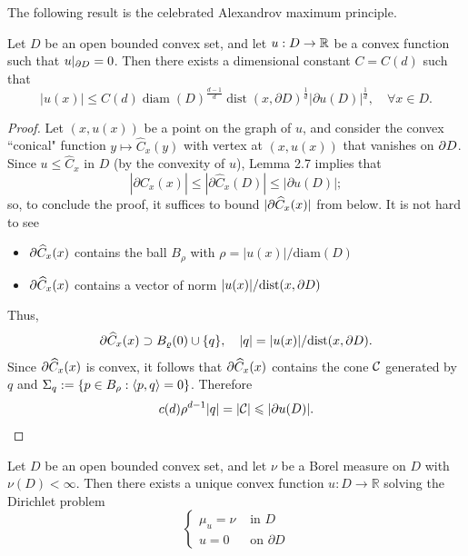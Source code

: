 	The following result is  the celebrated Alexandrov maximum principle.
	\begin{theorem}
		Let $D$ be  an open bounded convex set, and let $u: D\to {\mathbb R}$ be a convex function such that $u|_{\partial D}=0$. Then there exists a dimensional constant $C=C(d)$
		such that 
		\begin{equation}\label{eq:abp}
			|u(x)| \leq C(d) \operatorname{diam}(D)^{\frac{d-1}{d}} \operatorname{dist}(x, \partial D)^{\frac{1}{d}}|\partial u(D)|^{\frac{1}{d}},  \quad \forall x \in D. 
		\end{equation}
	\end{theorem}
	\begin{proof}
		Let $(x, u(x))$ be a point on the graph of $u$, and consider the convex ``conical" function $y\mapsto \widehat C_x(y)$ with vertex at $(x, u(x))$ that vanishes on $\partial D$. 
		Since $u\leq \widehat C_x$ in $D$ (by the convexity of $u$), Lemma 2.7 implies that 
		$$
		\left|\partial \widehat{C}_x(x)\right| \leq\left|\partial \widehat{C}_x(D)\right| \leq|\partial u(D)| ;
		$$
		so, to conclude the proof, it suffices to bound $|\partial \widehat C_x(x)|$ from below. It is not hard to see 
		\begin{itemize}
			\item $\partial \widehat{C}_x(x)$ contains the ball $B_\rho$ with $\rho=|u(x)|/\mathrm{diam} (D)$
			\item $\partial \widehat{C}_x(x)$ contains a vector of norm $|u(x)|/\mathrm{dist} (x, \partial D)$
		\end{itemize}
		Thus, 
		$$
		\partial \widehat{C}_x(x) \supset B_{\varrho}(0) \cup\{q\}, \quad |q|=|u(x)|/\mathrm{dist} (x, \partial D). 
		$$
		Since $\partial \widehat{C}_x(x)$ is convex, it follows that $\partial \widehat{C}_x(x)$ contains the cone ${\mathcal C}$ generated
		by $q$ and $\Sigma_q:= \{p\in B_\rho: \langle p,q\rangle=0\}$. Therefore 
		$$
		c(d) \rho^{d-1} |q| = |{\mathcal C}| \leqslant |\partial u(D)|. 
		$$
	\end{proof}
	
	\begin{theorem}
		Let $D$ be an open bounded convex set, and let $\nu$ be a Borel measure on $D$ with $\nu(D)<\infty$. Then there exists a unique convex function $u: D \rightarrow \mathbb{R}$ solving the Dirichlet problem
		$$
		\begin{cases}
			\mu_u=\nu & \text { in } D \\ u=0 & \text { on } \partial D
		\end{cases}
		$$
	\end{theorem}
	
